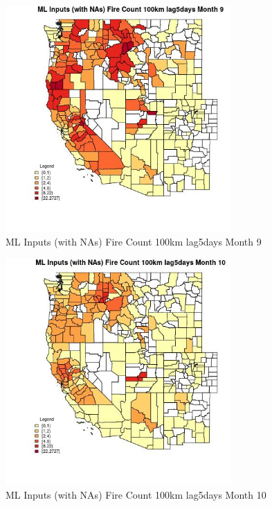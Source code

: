 \begin{figure} 
\centering  
\includegraphics[width=0.77\textwidth]{Code_Outputs/Report_ML_input_PM25_Step4_part_f_de_duplicated_aves_prioritize_24hr_obswNAs_CountyFire_Count_100km_lag5daysmedianMonth9.jpg} 
\caption{\label{fig:Report_ML_input_PM25_Step4_part_f_de_duplicated_aves_prioritize_24hr_obswNAsCountyFire_Count_100km_lag5daysmedianMonth9}ML Inputs (with NAs) Fire Count 100km lag5days Month 9} 
\end{figure} 
 

\begin{figure} 
\centering  
\includegraphics[width=0.77\textwidth]{Code_Outputs/Report_ML_input_PM25_Step4_part_f_de_duplicated_aves_prioritize_24hr_obswNAs_CountyFire_Count_100km_lag5daysmedianMonth10.jpg} 
\caption{\label{fig:Report_ML_input_PM25_Step4_part_f_de_duplicated_aves_prioritize_24hr_obswNAsCountyFire_Count_100km_lag5daysmedianMonth10}ML Inputs (with NAs) Fire Count 100km lag5days Month 10} 
\end{figure} 
 

